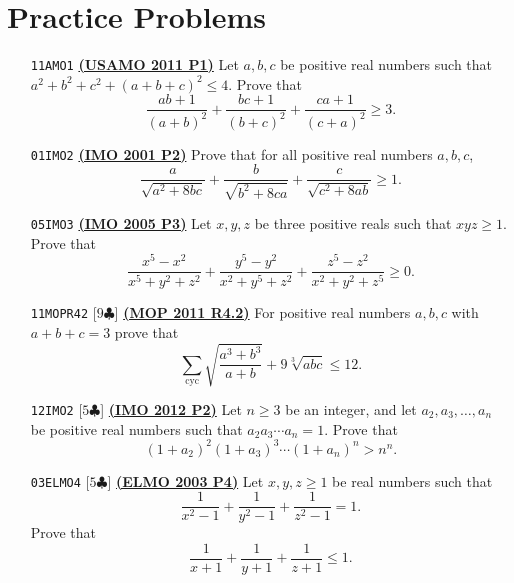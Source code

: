 \documentclass[12pt]{article}
\title{\unit}
\author{Samuel de Araújo Brandão}
\date{\today}
\begin{document}
\maketitle
\preface

\tableofcontents

\clearpage

\section{\textsf{Practice Problems}}
\begin{itemize}
	\item [\texttt{\textcolor{color7}{11AMO1}}] \href{https://artofproblemsolving.com/community/c5h404347p2254758}{\textbf{(USAMO 2011 P1)}} Let $a, b, c$ be positive real numbers such that $a^2+b^2+c^2+(a+b+c)^2\leq4$. Prove that
	      \[\frac{ab+1}{(a+b)^2}+\frac{bc+1}{(b+c)^2}+\frac{ca+1}{(c+a)^2}\geq 3.\]
	\item [\texttt{\textcolor{color7}{01IMO2}}] \href{https://artofproblemsolving.com/community/c6h17451p119168}{\textbf{(IMO 2001 P2)}} Prove that for all positive real numbers $a,b,c$,\[ \frac{a}{\sqrt{a^2 + 8bc}} + \frac{b}{\sqrt{b^2 + 8ca}} + \frac{c}{\sqrt{c^2 + 8ab}} \geq 1.  \]
	\item [\texttt{\textcolor{color7}{05IMO3}}] \href{https://artofproblemsolving.com/community/c6h44480p281573}{\textbf{(IMO 2005 P3)}} Let $x,y,z$ be three positive reals such that $xyz\geq 1$. Prove that
	      \[ \frac { x^5-x^2 }{x^5+y^2+z^2} + \frac {y^5-y^2}{x^2+y^5+z^2} + \frac {z^5-z^2}{x^2+y^2+z^5} \geq 0 . \]
	\item [\texttt{\textcolor{color6}{11MOPR42}}] \textcolor{color6}{[$9\clubsuit$]} \href{https://artofproblemsolving.com/community/c6h3204552p29271422}{\textbf{(MOP 2011 R4.2)}} For positive real numbers $a, b, c$ with $a + b + c = 3$ prove that
	      \[\sum_{\text{cyc}}\sqrt{\frac{a^3+b^3}{a+b}}+9\sqrt[3]{abc}\le12.\]
	\item [\texttt{\textcolor{color6}{12IMO2}}] \textcolor{color6}{[$5\clubsuit$]} \href{https://artofproblemsolving.com/community/p2736375}{\textbf{(IMO 2012 P2)}} Let $n\ge 3$ be an integer, and let $a_2,a_3,\ldots ,a_n$ be positive real numbers such that $a_{2}a_{3}\cdots a_{n}=1$. Prove that
	      \[(1 + a_2)^2 (1 + a_3)^3 \dotsm (1 + a_n)^n > n^n.\]
	\item [\texttt{\textcolor{color6}{03ELMO4}}] \textcolor{color6}{[$5\clubsuit$]} \href{https://artofproblemsolving.com/community/c6h514107p2887981}{\textbf{(ELMO 2003 P4)}} Let $x,y,z \ge 1$ be real numbers such that\[ \frac{1}{x^2-1} + \frac{1}{y^2-1} + \frac{1}{z^2-1} = 1. \]Prove that\[ \frac{1}{x+1} + \frac{1}{y+1} + \frac{1}{z+1} \le 1. \]

\end{itemize}
\end{document}
